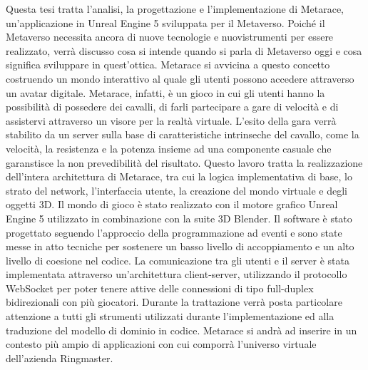 Questa tesi tratta l'analisi, la progettazione e l'implementazione di Metarace, un'applicazione in Unreal Engine 5 sviluppata per il Metaverso.
%
Poiché il Metaverso necessita ancora di nuove tecnologie e nuovistrumenti per essere realizzato, verrà discusso cosa si intende quando si parla di Metaverso oggi e cosa significa sviluppare in quest'ottica.
%
Metarace si avvicina a questo concetto costruendo un mondo interattivo al quale gli utenti possono accedere attraverso un avatar digitale.
%
Metarace, infatti, è un gioco in cui gli utenti hanno la possibilità di possedere dei cavalli, di farli partecipare a gare di velocità e di assistervi attraverso un visore per la realtà virtuale.
%
L'esito della gara verrà stabilito da un server sulla base di caratteristiche intrinseche del cavallo, come la velocità, la resistenza e la potenza insieme ad una componente casuale che garanstisce la non prevedibilità del risultato.
%
Questo lavoro tratta la realizzazione dell'intera architettura di Metarace, tra cui la logica implementativa di base, lo strato del network, l'interfaccia utente, la creazione del mondo virtuale e degli oggetti 3D.
%
Il mondo di gioco è stato realizzato con il motore grafico Unreal Engine 5 utilizzato in combinazione con la suite 3D Blender.
%
Il software è stato progettato seguendo l'approccio della programmazione ad eventi e sono state messe in atto tecniche per sostenere un basso livello di accoppiamento e un alto livello di coesione nel codice.
%
La comunicazione tra gli utenti e il server è stata implementata attraverso un'architettura client-server, utilizzando il protocollo WebSocket per poter tenere attive delle connessioni di tipo full-duplex bidirezionali con più giocatori.
%
Durante la trattazione verrà posta particolare attenzione a tutti gli strumenti utilizzati durante l'implementazione ed alla traduzione del modello di dominio in codice.
%
Metarace si andrà ad inserire in un contesto più ampio di applicazioni con cui comporrà l'universo virtuale dell'azienda Ringmaster.


